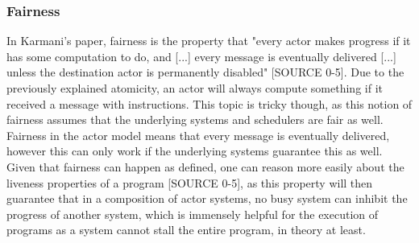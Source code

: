 \documentclass[A4]{article}
\begin{document}
\subsubsection{Fairness}
In Karmani's paper, fairness is the property that "every actor makes progress if it has some computation to do, and [...] every message is eventually delivered [...] unless the destination actor is permanently disabled" [SOURCE 0-5]. Due to the previously explained atomicity, an actor will always compute something if it received a message with instructions. 
This topic is tricky though, as this notion of fairness assumes that the underlying systems and schedulers are fair as well. Fairness in the actor model means that every message is eventually delivered, however this can only work if the underlying systems guarantee this as well. 
Given that fairness can happen as defined, one can reason more easily about the liveness properties of a program [SOURCE 0-5], as this property will then guarantee that in a composition of actor systems, no busy system can inhibit the progress of another system, which is immensely helpful for the execution of programs as a system cannot stall the entire program, in theory at least. 
\end{document}
